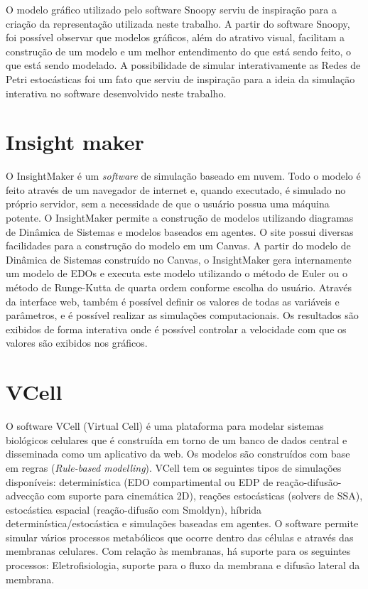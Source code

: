 \documentclass[
	12pt,				%
	openright,			%
	oneside,			%
	a4paper,			%
	main=brazil,
	english,			%
	]{ufsj-abntex2}
\begin{document}
O modelo gráfico utilizado pelo software Snoopy serviu de inspiração para a criação da representação utilizada neste trabalho. A partir do software Snoopy, foi possível observar que modelos gráficos, além do atrativo visual, facilitam a construção de um modelo e um melhor entendimento do que está sendo feito, o que está sendo modelado. A possibilidade de simular interativamente as Redes de Petri estocásticas foi um fato que serviu de inspiração para a ideia da simulação interativa no software desenvolvido neste trabalho. 

\section{Insight maker}
    
O InsightMaker \cite{insightmaker} é um \textit{software} de simulação baseado em nuvem. Todo o modelo é feito através de um navegador de internet e, quando executado, é simulado no próprio servidor, sem a necessidade de que o usuário possua uma máquina potente. O InsightMaker \cite{insightmaker} permite a construção de modelos utilizando diagramas de Dinâmica de Sistemas e modelos baseados em agentes. O site possui diversas facilidades para a construção do modelo em um Canvas. A partir do modelo de Dinâmica de Sistemas construído no Canvas, o InsightMaker \cite{insightmaker} gera internamente um modelo de EDOs e executa este modelo utilizando o método de Euler ou o método de Runge-Kutta de quarta ordem conforme escolha do usuário. Através da interface web, também é possível definir os valores de todas as variáveis e parâmetros, e é possível realizar as simulações computacionais. Os resultados são exibidos de forma interativa onde é possível controlar a velocidade com que os valores são exibidos nos gráficos. 

\section{VCell}

O software VCell (Virtual Cell) \cite{vcell,VCellref1} é uma plataforma para modelar sistemas biológicos celulares que é construída em torno de um banco de dados central e disseminada como um aplicativo da web. Os modelos são construídos com base em regras (\textit{Rule-based modelling}). VCell tem os seguintes tipos de simulações disponíveis: determinística (EDO compartimental ou EDP de reação-difusão-advecção com suporte para cinemática 2D), reações estocásticas (solvers de SSA), estocástica espacial (reação-difusão com Smoldyn), híbrida determinística/estocástica e simulações baseadas em agentes. O software permite simular vários processos metabólicos que ocorre dentro das células e através das membranas celulares. Com relação às membranas, há suporte para os seguintes processos: Eletrofisiologia, suporte para o fluxo da membrana e difusão lateral da membrana. 
\end{document}
